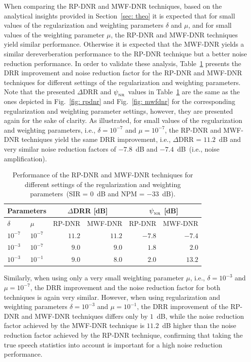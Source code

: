 \documentclass[draftcls,onecolumn,11pt]{IEEEtran}
\begin{document}
When comparing the RP-DNR and MWF-DNR techniques, based on the analytical insights provided in Section~\ref{sec: theo} it is expected that for small values of the regularization and weighting parameters $\delta$ and $\mu$, and for small values of the weighting parameter $\mu$, the RP-DNR and MWF-DNR techniques yield similar performance. 
Otherwise it is expected that the MWF-DNR yields a similar dereverberation performance to the RP-DNR technique but a better noise reduction performance.
In order to validate these analysis, Table~\ref{tbl: rp_mwf} presents the DRR improvement and noise reduction factor for the RP-DNR and MWF-DNR techniques for different settings of the regularization and weighting parameters.
Note that the presented $\Delta$DRR and $\psi_{_{\rm NR}}$ values in Table~\ref{tbl: rp_mwf} are the same as the ones depicted in Fig.~\ref{fig: rpdnr} and Fig.~\ref{fig: mwfdnr} for the corresponding regularization and weighting parameter settings, however, they are presented again for the sake of clarity.
As illustrated, for small values of the regularization and weighting parameters, i.e., $\delta = 10^{-7}$ and $\mu = 10^{-7}$, the RP-DNR and MWF-DNR techniques yield the same DRR improvement, i.e., $\Delta$DRR = $11.2$~dB and very similar noise reduction factors of $-7.8$~dB and $-7.4$~dB~(i.e., noise amplification).
\begin{table}[t!]
\begin{center}
  \caption{Performance of the RP-DNR and MWF-DNR techniques for different settings of the regularization and weighting parameters~(SIR = $0$~dB and NPM = $-33$~dB).}
  \label{tbl: rp_mwf}
  \begin{tabularx}{\linewidth}{Xlrrrr}
    \toprule
       \multicolumn{2}{c}{Parameters} & \multicolumn{2}{c}{$\Delta$DRR [dB]} & \multicolumn{2}{c}{$\psi_{_{\rm NR}}$ [dB]} \\
      \midrule
      $\delta$ & $\mu$ & RP-DNR & MWF-DNR & RP-DNR & MWF-DNR \\
      $10^{-7}$ & $10^{-7}$ & $11.2$ & $11.2$ & $-7.8$ & $-7.4$ \\
      $10^{-3}$ & $10^{-7}$ & $9.0$ & $9.0$ & $1.8$ & $2.0$ \\
      $10^{-3}$ & $10^{-1}$ & $9.0$ & $8.0$ & $2.0$ & $13.2$ \\
    \bottomrule
  \end{tabularx}
\end{center}
\end{table}
Similarly, when using only a very small weighting parameter $\mu$, i.e., $\delta = 10^{-3}$ and $\mu = 10^{-7}$, the DRR improvement and the noise reduction factor for both techniques is again very similar. 
However, when using regularization and weighting parameters $\delta = 10^{-3}$ and $\mu = 10^{-1}$, the DRR improvement of the RP-DNR and MWF-DNR techniques differs only by $1$~dB, while the noise reduction factor achieved by the MWF-DNR technique is $11.2$~dB higher than the noise reduction factor achieved by the RP-DNR technique, confirming that taking the true speech statistics into account is important for a high noise reduction performance.
\end{document}
